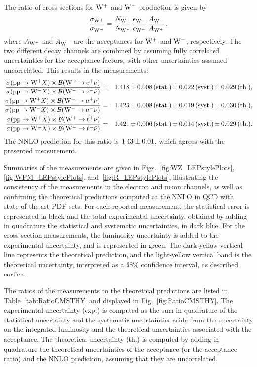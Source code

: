 The ratio of cross sections for $\Wp$ and $\Wm$ production is given by
\begin{displaymath}
  \frac{\sigma_{\Wp}}{\sigma_{\Wm}} =
  \frac{N_{\Wp}}{N_{\Wm}} \,
  \frac{\epsilon_{\Wm}}{\epsilon_{\Wp}} \,
  \frac{A_{\Wm}}{A_{\Wp}} \,,
\end{displaymath}
where $A_{\Wp}$ and $A_{\Wm}$ are the acceptances for $\Wp$ and $\Wm$, respectively.
The two different decay channels are combined by assuming fully correlated uncertainties for the acceptance
factors, with other uncertainties assumed uncorrelated.  This results
in the measurements:
\begin{eqnarray*}
  \RESRATWWE , \\
  \RESRATWWM , \\
  \RESRATWWL . \\
\end{eqnarray*}
The NNLO prediction for this ratio is $\THEORYRATIOWW$, which agrees
with the presented measurement.

Summaries of the measurements are given in Figs.~\ref{fig:WZ_LEPstylePlots},
 \ref{fig:WPM_LEPstylePlots}, and~\ref{fig:R_LEPstylePlots},
illustrating the consistency of the measurements
in the electron and muon channels, as well as confirming the
theoretical predictions computed at the NNLO in QCD with state-of-the-art
PDF sets. For each reported measurement, the statistical error is represented in black and
the total experimental uncertainty, obtained by adding in quadrature the statistical and
systematic uncertainties, in dark blue. For the cross-section measurements, the luminosity
uncertainty is added to the experimental uncertainty, and is represented in green.
The dark-yellow vertical line represents the theoretical prediction, and the light-yellow
vertical band is the theoretical uncertainty, interpreted as a 68$\%$ confidence interval,
as described earlier.

The ratios of the measurements to the theoretical
predictions are listed in Table~\ref{tab:RatioCMSTHY}
and displayed in Fig.~\ref{fig:RatioCMSTHY}. The experimental
uncertainty (exp.) is computed as the sum in quadrature of the
statistical uncertainty and the systematic uncertainties aside
from the uncertainty on the integrated luminosity and the
theoretical uncertainties associated with the acceptance.
The theoretical uncertainty (th.) is computed by adding in
quadrature the theoretical uncertainties of the acceptance (or the
acceptance ratio) and the NNLO prediction, assuming that they are
uncorrelated.


